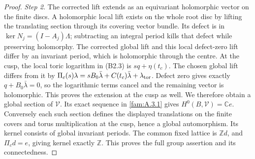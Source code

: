 \begin{proof}
\par\noindent\textit{Step 2.} The corrected lift extends as an equivariant holomorphic vector on the finite discs. A holomorphic local lift exists on the whole root disc by lifting the translating section through its covering vector bundle. Its defect is in $\ker N_j=(I-A_j)\Lambda$; subtracting an integral period kills that defect while preserving holomorphy. The corrected global lift and this local defect-zero lift differ by an invariant period, which is holomorphic through the centre. At the cusp, the local toric logarithm in (B2.3) is $sq+\eta(t_c)$. The chosen global lift differs from it by $\Pi_c(s)\lambda=sB_0\bar\lambda+C(t_c)\bar\lambda+\lambda_{\rm tor}$. Defect zero gives exactly $q+B_0\bar\lambda=0$, so the logarithmic terms cancel and the remaining vector is holomorphic. This proves the extension at the cusp as well. We therefore obtain a global section of $\mathcal V$. Its exact sequence in \ref{fam:A.3.1} gives $H^0(B,\mathcal V)=\mathbb Ce$. Conversely each such section defines the displayed translations on the finite covers and torus multiplication at the cusp, hence a global automorphism. Its kernel consists of global invariant periods. The common fixed lattice is $\mathbb Zd$, and $\Pi_cd=e$, giving kernel exactly $\mathbb Z$. This proves the full group assertion and its connectedness.
\end{proof}
